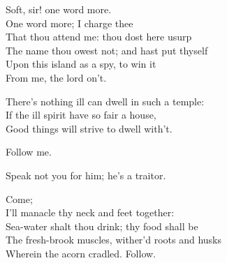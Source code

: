 \begin{verse_speech}[Prospero] 
Soft, sir! one word more.\\
One word more; I charge thee\\
That thou attend me: thou dost here usurp\\
The name thou owest not; and hast put thyself\\
Upon this island as a spy, to win it\\
From me, the lord on't.
\end{verse_speech}

	
\begin{verse_speech}[Miranda] 
There's nothing ill can dwell in such a temple:\\
If the ill spirit have so fair a house,\\
Good things will strive to dwell with't.
\end{verse_speech}

\begin{verse_speech}[Prospero] 
Follow me.\\

Speak not you for him; he's a traitor. \\


Come;\\
I'll manacle thy neck and feet together:\\
Sea-water shalt thou drink; thy food shall be\\
The fresh-brook muscles, wither'd roots and husks\\
Wherein the acorn cradled. Follow.\\
\end{verse_speech}

